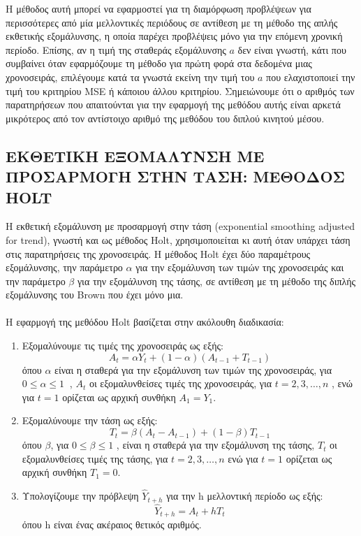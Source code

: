 Η μέθοδος αυτή μπορεί να εφαρμοστεί για τη διαμόρφωση προβλέψεων για
περισσότερες από μία μελλοντικές περιόδους σε αντίθεση με τη μέθοδο της απλής
εκθετικής εξομάλυνσης, η οποία παρέχει προβλέψεις μόνο για την επόμενη χρονική
περίοδο. Επίσης, αν η τιμή της σταθεράς εξομάλυνσης $a$ δεν είναι γνωστή, κάτι που
συμβαίνει όταν εφαρμόζουμε τη μέθοδο για πρώτη φορά στα δεδομένα μιας
χρονοσειράς, επιλέγουμε κατά τα γνωστά εκείνη την τιμή του $a$ που ελαχιστοποιεί
την τιμή του κριτηρίου MSE ή κάποιου άλλου κριτηρίου. Σημειώνουμε ότι ο αριθμός
των παρατηρήσεων που απαιτούνται για την εφαρμογή της μεθόδου αυτής είναι αρκετά μικρότερος από τον αντίστοιχο αριθμό της μεθόδου του διπλού κινητού
μέσου.

\subsection{ΕΚΘΕΤΙΚΗ ΕΞΟΜΑΛΥΝΣΗ ΜΕ ΠΡΟΣΑΡΜΟΓΗ ΣΤΗΝ ΤΑΣΗ:  ΜΕΘΟΔΟΣ HOLT}
Η εκθετική εξομάλυνση με προσαρμογή στην τάση (exponential smoothing
adjusted for trend), γνωστή και ως μέθοδος Holt, χρησιμοποιείται κι αυτή όταν
υπάρχει τάση στις παρατηρήσεις της χρονοσειράς. Η μέθοδος Holt έχει δύο
παραμέτρους εξομάλυνσης, την παράμετρο $\alpha $ για την εξομάλυνση των τιμών της
χρονοσειράς και την παράμετρο $\beta $ για την εξομάλυνση της τάσης, σε αντίθεση με τη
μέθοδο της διπλής εξομάλυνσης του Brown που έχει μόνο μια.\\\\
Η εφαρμογή της μεθόδου Holt βασίζεται στην ακόλουθη διαδικασία:\\
\begin{enumerate}
\item Εξομαλύνουμε τις τιμές της χρονοσειράς ως εξής:\\
$$ A_t=\alpha Y_t + \left(1-\alpha\right) \left(A_{t-1}+T_{t-1}\right) $$ 
όπου $\alpha$ είναι η σταθερά για την εξομάλυνση των τιμών της χρονοσειράς, για
$0 \leq \alpha \leq 1\:$ , $A_t$ οι εξομαλυνθείσες τιμές της χρονοσειράς, για $t = 2,3,\ldots,n$ , ενώ για $t=1$
ορίζεται ως αρχική συνθήκη $ A_1 = Y_1$.

\item Εξομαλύνουμε την τάση ως εξής:\\
$$T_t=\beta \left(A_t -A_{t-1}\right)+\left(1-\beta\right)T_{t-1} $$
όπου $\beta$, για $0 \leq \beta \leq 1$ , είναι η σταθερά για την εξομάλυνση της τάσης, $T_t$ οι
εξομαλυνθείσες τιμές της τάσης, για $t=2,3,\ldots,n$ ενώ για $t=1$ ορίζεται ως αρχική
συνθήκη $T_1 =0$.

\item Υπολογίζουμε την πρόβλεψη $ \widehat{Y}_{t+h} $ για την h μελλοντική περίοδο ως εξής:\\
$$\widehat{Y}_{t+h}=A_t+hT_t $$
όπου h είναι ένας ακέραιος θετικός αριθμός.\\
\end{enumerate}

